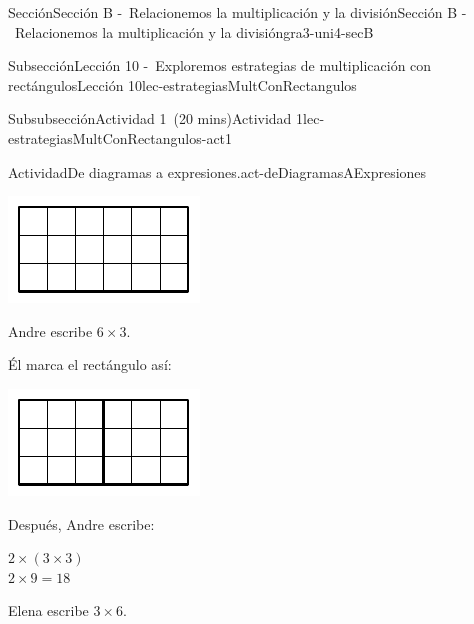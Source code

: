 \documentclass[oneside,10pt,]{article}
\begin{document}
\begin{sectionptx}{Sección}{Sección B -~Relacionemos la multiplicación y la división}{}{Sección B -~Relacionemos la multiplicación y la división}{}{}{gra3-uni4-secB}
\begin{subsectionptx}{Subsección}{Lección 10 -~Exploremos estrategias de multiplicación con rectángulos}{}{Lección 10}{}{}{lec-estrategiasMultConRectangulos}
\begin{subsubsectionptx}{Subsubsección}{Actividad 1~(20 mins)}{}{Actividad 1}{}{}{lec-estrategiasMultConRectangulos-act1}
\begin{activity}{Actividad}{De diagramas a expresiones.}{act-deDiagramasAExpresiones}
\begin{sidebyside}{2}{0.025}{0.025}{0.05}
\begin{sbspanel}{0.5}
\includegraphics[width=\linewidth]{external/svg-source/tikz-file-153043.pdf}
\end{sbspanel}%
\end{sidebyside}%
\begin{sidebyside}{3}{0}{0}{0.065}%
\begin{sbspanel}{0.27}%
Andre escribe \(6\times 3\).%
\end{sbspanel}%
\begin{sbspanel}{0.35}%
Él marca el rectángulo así:%
\par
\includegraphics[width=\linewidth]{external/svg-source/tikz-file-153044.pdf}
\end{sbspanel}%
\begin{sbspanel}{0.25}%
Después, Andre escribe:%
\par
\(2 \times (3 \times 3)\)\\
 \(2 \times 9 = 18\)%
\end{sbspanel}%
\end{sidebyside}%
\begin{sidebyside}{3}{0}{0}{0.065}%
\begin{sbspanel}{0.27}%
Elena escribe \(3\times 6\).%

\end{sbspanel}
\end{sidebyside}
\end{activity}
\end{subsubsectionptx}
\end{subsectionptx}
\end{sectionptx}
\end{document}
